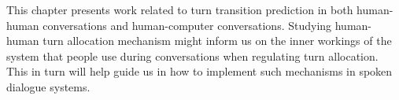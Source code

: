 This chapter presents work related to turn transition prediction in both human-human conversations and human-computer conversations. Studying human-human turn allocation mechanism might
%
inform us on the inner workings of the system that people use
%
during conversations when regulating turn allocation. This in turn
%
will help guide us in
%
how to implement such mechanisms in spoken dialogue systems.

